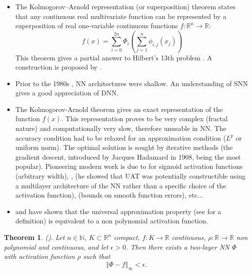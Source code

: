\documentclass{article}
\newtheorem{theorem}{Theorem}
\begin{document}
\begin{itemize}
\item The Kolmogorov--Arnold representation (or superposition) theorem \citep{kolmogorov1957representation} states that any continuous real multivariate function can be represented by a superposition of real one-variable continuous functions $f:\mathbb{R}^{n}\rightarrow\mathbb{R}$:
\[
f(x)  =\sum_{i=0}^{2n}\Phi_{i}\left(  \sum_{j=1}^{n}\phi
_{i,j}(x_{j})  \right)
\]
This theorem gives a partial answer to Hilbert's 13th problem \citep{akashi2001application,khesin2014arnold}. A construction is proposed by \cite{polar2020urysohn}.

\item Prior to the 1980s \citep{mcculloch1943logical,fukushima1975cognitron}, NN architectures were shallow. An understanding of SNN gives a good appreciation of DNN.

\item The Kolmogorov-Arnold theorem gives an exact representation of the function $f(x)$. This representation proves to be very complex (fractal nature) and computationally very slow, therefore unusable in NN. The accuracy condition had to be relaxed for an approximation condition ($L^{p}$
or uniform norm). The optimal solution is sought by iterative methods (the
gradient descent, introduced by Jacques Hadamard in 1908, being the most
popular). Pioneering modern work is due to \cite{cybenko1989approximation} for
sigmoid activation functions (arbitrary width), \cite{funahashi1989approximate}, \cite{hornik1991approximation} (he showed that UAT was
potentially constructible using a multilayer architecture of the NN rather
than a specific choice of the activation function), \cite{barron1993universal} (bounds on smooth function errors), etc...

\item  \cite{leshno1993multilayer} and \cite{pinkus1999approximation} have
shown that the universal approximation property (see \cite{kratsios2019universal} for a
definition) is equivalent to a non polynomial activation function.
\end{itemize}

\begin{theorem}
(\cite{cybenko1989approximation,hornik1991approximation,pinkus1999approximation}). Let $n\in\mathbb{N}$, $K\subset\mathbb{R}^{n}$ compact, $f:K\rightarrow\mathbb{R}$ continuous, $\rho:\mathbb{R}\rightarrow\mathbb{R}$ non polynomial and continuous, and let $\epsilon>0$. Then there exists a
two-layer NN $\Phi$ with activation function $\rho$ such that
\[
\left\Vert \Phi-f\right\Vert _{\infty}<\epsilon.
\]
\end{theorem}
\end{document}
